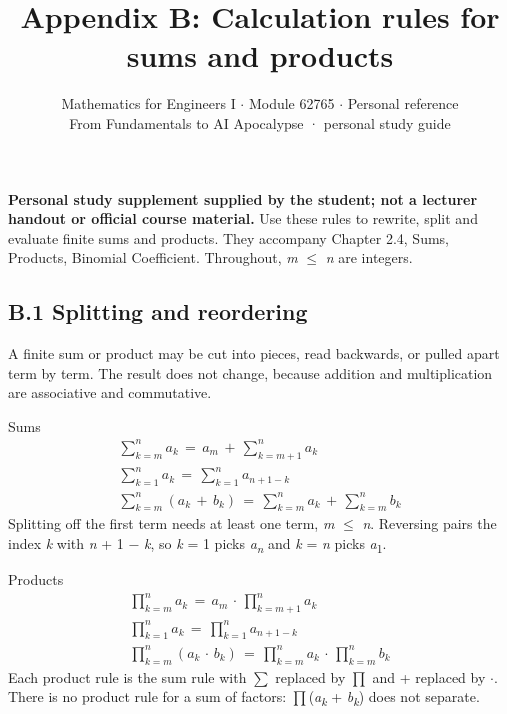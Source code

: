 \documentclass[11pt]{article}
\title{\sffamily\bfseries\color{FAUblue}Appendix B: Calculation rules for sums and products}
\author{Mathematics for Engineers I \ensuremath{\cdot} Module 62765 \ensuremath{\cdot} Personal reference\\[2pt]\small From Fundamentals to AI Apocalypse · personal study guide}
\date{}
\begin{document}
\maketitle
\begingroup\footnotesize\setlength{\parskip}{0pt}\tableofcontents\endgroup
\clearpage

{\large \textbf{Personal study supplement supplied by the student; not a lecturer handout or official course material.} Use these rules to rewrite, split and evaluate finite sums and products. They accompany Chapter 2.4, Sums, Products, Binomial Coefficient. Throughout, \textit{m} \ensuremath{\leq} \textit{n} are integers.}


\begin{keepsection}
\section{B.1 Splitting and reordering}

A finite sum or product may be cut into pieces, read backwards, or pulled apart term by term. The result does not change, because addition and multiplication are associative and commutative.

\begin{equationcard}{Sums}
\[ \begin{gathered} \sum_{{k}={m}}^{{n}} {a}_{{k}}\, =\, {a}_{{m}}\, +\, \sum_{{k}={m}+1}^{{n}} {a}_{{k}} \\ \sum_{{k}=1}^{{n}} {a}_{{k}}\, =\, \sum_{{k}=1}^{{n}} {a}_{{n}+1-{k}} \\ \sum_{{k}={m}}^{{n}} ({a}_{{k}}\, +\, {b}_{{k}})\, =\, \sum_{{k}={m}}^{{n}} {a}_{{k}}\, +\, \sum_{{k}={m}}^{{n}} {b}_{{k}} \end{gathered} \]
{\small Splitting off the first term needs at least one term, \textit{m} \ensuremath{\leq} \textit{n}. Reversing pairs the index \textit{k} with \textit{n} + 1 \ensuremath{-} \textit{k}, so \textit{k} = 1 picks \textit{a}\textsubscript{\textit{n}} and \textit{k} = \textit{n} picks \textit{a}\textsubscript{1}.}
\end{equationcard}

\begin{equationcard}{Products}
\[ \begin{gathered} \prod_{{k}={m}}^{{n}} {a}_{{k}}\, =\, {a}_{{m}}\, \cdot \, \prod_{{k}={m}+1}^{{n}} {a}_{{k}} \\ \prod_{{k}=1}^{{n}} {a}_{{k}}\, =\, \prod_{{k}=1}^{{n}} {a}_{{n}+1-{k}} \\ \prod_{{k}={m}}^{{n}} ({a}_{{k}}\, \cdot \, {b}_{{k}})\, =\, \prod_{{k}={m}}^{{n}} {a}_{{k}}\, \cdot \, \prod_{{k}={m}}^{{n}} {b}_{{k}} \end{gathered} \]
{\small Each product rule is the sum rule with \ensuremath{\textstyle\sum} replaced by \ensuremath{\textstyle\prod} and + replaced by \ensuremath{\cdot}. There is no product rule for a sum of factors: \ensuremath{\textstyle\prod}(\textit{a}\textsubscript{\textit{k}} + \textit{b}\textsubscript{\textit{k}}) does not separate.}
\end{equationcard}
\end{keepsection}
\end{document}
